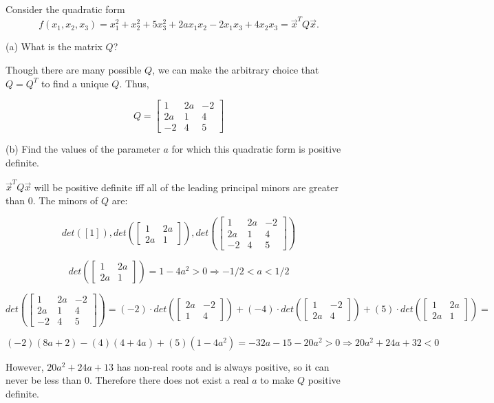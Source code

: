 \documentclass[12pt]{extarticle}
\theoremstyle{definition}
\begin{document}
\begin{problem}
Consider the quadratic form 
$$f(x_1,x_2,x_3)=x_1^2+x_2^2+5x_3^2+2ax_1x_2-2x_1x_3+4x_2x_3=\vec{x}^TQ\vec{x}.$$

	\begin{description}
		\item{(a)} What is the matrix $Q$?

		Though there are many possible $Q$, we can make the arbitrary choice that $Q=Q^T$ to find a unique $Q$. Thus,

		$$Q=\begin{bmatrix} 1 & 2a & -2\\ 2a & 1 & 4\\ -2 & 4 & 5\end{bmatrix}$$

		\item{(b)} Find the values of the parameter $a$ for which this quadratic form is positive definite.

		$\vec{x}^TQ\vec{x}$ will be positive definite iff all of the leading principal minors are greater than 0. The minors of $Q$ are:

		$$det([1]), det(\begin{bmatrix} 1 & 2a\\ 2a & 1 \end{bmatrix}), det(\begin{bmatrix} 1 & 2a & -2\\ 2a & 1 & 4\\ -2 & 4 & 5\end{bmatrix})$$

		$$det(\begin{bmatrix} 1 & 2a\\ 2a & 1 \end{bmatrix})=1-4a^2 > 0 \Longrightarrow -1/2 < a < 1/2$$

		$$det(\begin{bmatrix} 1 & 2a & -2\\ 2a & 1 & 4\\ -2 & 4 & 5\end{bmatrix}) = (-2)\cdot det(\begin{bmatrix} 2a & -2\\ 1 & 4\end{bmatrix}) + 
		(-4)\cdot det(\begin{bmatrix} 1 & -2\\ 2a & 4\end{bmatrix}) + (5)\cdot det(\begin{bmatrix} 1 & 2a\\ 2a & 1\end{bmatrix}) = $$

		$$(-2)(8a+2) - (4)(4+4a) + (5)(1-4a^2) = -32a-15-20a^2 > 0 \Longrightarrow 20a^2+24a+32 < 0$$

		However, $20a^2+24a+13$ has non-real roots and is always positive, so it can never be less than 0. Therefore there does not exist a real $a$ to make $Q$ positive definite.

	\end{description}
\end{problem}
\end{document}
